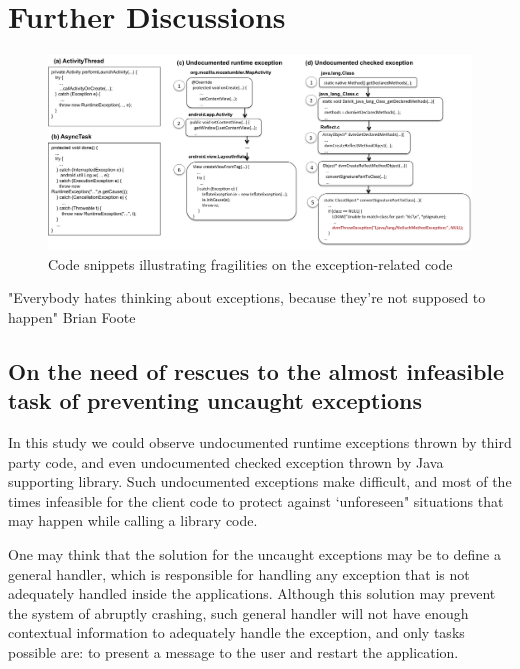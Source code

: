 \documentclass[conference]{IEEEtran}
\begin{document}
\noindent {}


\section{Further Discussions}
\label{sec:disc}

\begin{figure} \centering \includegraphics[scale=0.55]{examples_new2.png}
\caption{Code snippets illustrating fragilities on the exception-related code} \label{fig:snippets} \end{figure}

 "Everybody hates thinking about exceptions, because they’re not supposed to happen"
  Brian Foote


\subsection{On the need of rescues to the almost infeasible task of preventing uncaught exceptions}
In this study we could observe undocumented runtime exceptions thrown by third party code,
and even undocumented checked exception thrown by Java supporting library.
Such undocumented exceptions make difficult, and most of the times infeasible
for the client code to protect against `unforeseen" situations that may happen 
while calling a library code.

One may think that the solution for the uncaught exceptions may be to define a general handler, 
which is responsible for handling any exception that is not
adequately handled inside the applications. Although this 
solution may prevent  the system of abruptly crashing,
 such general handler will not have enough
contextual information to adequately handle the exception, 
and only tasks possible are: to present a message to the user
 and restart the application.
\end{document}
